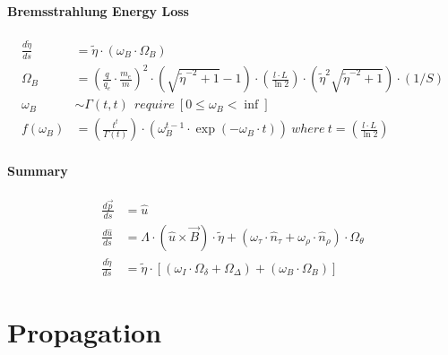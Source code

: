 \documentclass[review]{elsarticle}
\begin{document}
\paragraph{Bremsstrahlung Energy Loss}
\begin{equation} \begin{alignedat}{-1}
    \frac{d\tilde{\eta}}{ds}&=\tilde{\eta}\cdot\left(\omega_{B}\cdot\Omega_{B}\right) \\
    \Omega_{B}&={\left(\frac{q}{q_{e}}\cdot\frac{m_{e}}{m}\right)}^{2}\cdot(\sqrt{\tilde{\eta}^{-2}+1}-1)\cdot\left(\frac{l\cdot L}{\ln{2}}\right)\cdot(\tilde{\eta}^{2}\sqrt{\tilde{\eta}^{-2}+1})\cdot(1/S) \\
    \omega_{B}&\sim\Gamma\left(t,t\right)\ \ require\ \left[0\leq\omega_{B}<\inf\right] \\ 
    f\left(\omega_{B}\right)&=\left(\frac{t^t}{\Gamma\left(t\right)}\right)\cdot\left(\omega_{B}^{t-1}\cdot\exp{\left(-\omega_{B}\cdot t\right)}\right)\ where\ t=\left(\frac{l\cdot L}{\ln{2}}\right)
\end{alignedat} \end{equation} 

\paragraph{Summary}
\begin{equation} \begin{alignedat}{-1}
    \frac{d\vec{p}}{ds}&=\hat{u} \\
    \frac{d\hat{u}}{ds}&=\Lambda\cdot(\hat{u}\times\vec{B})\cdot\tilde{\eta}+(\omega_{\tau}\cdot\hat{n}_{\tau}+\omega_{\rho}\cdot\hat{n}_{\rho})\cdot\Omega_{\theta} \\
    \frac{d\tilde{\eta}}{ds}&=\tilde{\eta}\cdot\left[\left(\omega_{I}\cdot\Omega_{\delta}+\Omega_{\Delta}\right)+\left(\omega_{B}\cdot\Omega_{B}\right)\right]
\end{alignedat} \end{equation} 

\section{Propagation}
\end{document}
